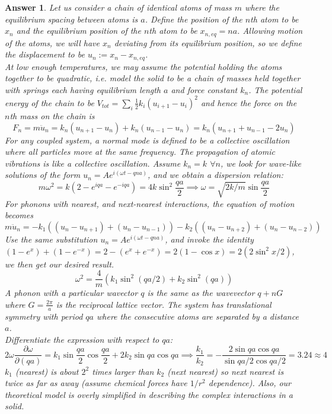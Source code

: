 \documentclass[a4paper]{article}
\newtheorem{ans}{Answer}[section]
\theoremstyle{new}
\begin{document}
\begin{ans}
Let us consider a chain of identical atoms of mass $m$ where the equilibrium spacing between atoms is $a$. Define the position of the $n$th atom to be $x_n$ and the equilibrium position of the $n$th atom to be $x_{n,eq}=na$. Allowing motion of the atoms, we will have $x_n$ deviating from its equilibrium position, so we define the displacement to be $u_n:=x_n-x_{n,eq}$.\\[10pt]
At low enough temperatures, we may assume the potential holding the atoms together to be quadratic, i.e. model the solid to be a chain of masses held together with springs each having equilibrium length $a$ and force constant $k_n$. The potential energy of the chain to be $V_{tot}=\sum_i\frac{1}{2}k_i(u_{i+1}-u_i)^2$ and hence the force on the $n$th mass on the chain is $$F_n=m\ddot{u}_n=k_n(u_{n+1}-u_n)+k_n(u_{n-1}-u_n)=k_n(u_{n+1}+u_{n-1}-2u_n)$$
For any coupled system, a normal mode is defined to be a collective oscillation where all particles move at the same frequency. The propagation of atomic vibrations is like a collective oscillation. Assume $k_n=k$ $\forall n$, we look for wave-like solutions of the form $u_n=Ae^{i(\omega t-qna)}$, and we obtain a dispersion relation:
$$m\omega^2=k(2-e^{iqa}-e^{-iqa})=4k\sin^2\frac{qa}{2}\implies\omega=\sqrt{2k/m}\sin\frac{qa}{2}$$
For phonons with nearest, and next-nearest interactions, the equation of motion becomes
$$m\ddot{u}_n=-k_1((u_n-u_{n+1})+(u_n-u_{n-1}))-k_2((u_n-u_{n+2})+(u_n-u_{n-2}))$$
Use the same substitution $u_n=Ae^{i(\omega t-qna)}$, and invoke the identity $(1-e^x)+(1-e^{-x})=2-(e^x+e^{-x})=2(1-\cos x)=2(2\sin^2x/2)$, we then get our desired result.
$$\omega^2=\frac{4}{m}(k_1\sin^2(qa/2)+k_2\sin^2(qa))$$
A phonon with a particular wavector $q$ is the same as the wavevector $q+nG$ where $G=\frac{2\pi}{a}$ is the reciprocal lattice vector. The system has translational symmetry with period $qa$ where the consecutive atoms are separated by a distance $a$. \\[5pt]
Differentiate the expression with respect to $qa$:
$$2\omega\frac{\partial\omega}{\partial(qa)}=k_1\sin\frac{qa}{2}\cos\frac{qa}{2}+2k_2\sin qa\cos qa\implies\frac{k_1}{k_2}=-\frac{2\sin qa\cos qa}{\sin qa/2\cos qa/2}=3.24\approx 4$$
$k_1$ (nearest) is about $2^2$ times larger than $k_2$ (next nearest) so next nearest is twice as far as away (assume chemical forces have $1/r^2$ dependence). Also, our theoretical model is overly simplified in describing the complex interactions in a solid.
\end{ans}
\end{document}
